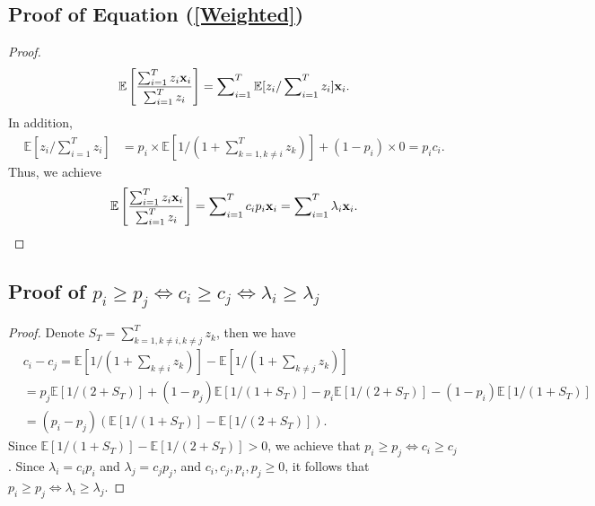 \documentclass{article} \usepackage{iclr2019_conference,times}
\begin{document}
\subsection{Proof of Equation (\ref{Weighted})}
\begin{proof}
\begin{align}
\mathbb{E}\left[ \frac{\sum\nolimits_{i = 1} ^T {{z_i}{{\bf{x}}_i}}}{\sum\nolimits_{i = 1}^T {{z_i}}} \right] =  \sum\nolimits_{i = 1}^T {\mathbb{E}[{z_i}/\sum\nolimits_{i=1}^T{{z_i}} ]} {{\bf{x}}_i}.
\end{align}
In addition, 
\begin{align}
{\mathbb{E}[{z_i}/\sum\nolimits_{i=1}^T{{z_i}} ]}& = p_i \times   \mathbb{E}\left[ {1/(1 + \sum\nolimits_{k = 1,k \ne i}^T {{z_k}} )} \right]  + (1-p_i) \times 0 
 = p_ic_i.
\end{align}
Thus, we achieve  
\begin{align}
\mathbb{E}\left[ \frac{\sum\nolimits_{i = 1} ^T {{z_i}{{\bf{x}}_i}}}{\sum\nolimits_{i = 1}^T {{z_i}}} \right] = \sum\nolimits_{i = 1} ^T {c_ip_i{\bf{x}}_i}  = \sum\nolimits_{i = 1} ^T {\lambda_i{\bf{x}}_i}.
\end{align}



\end{proof}

\subsection{Proof of ${p_i} \ge {p_j} \Leftrightarrow {c_i} \ge {c_j}  \Leftrightarrow {\lambda_i} \ge {\lambda_j} $}

\begin{proof}
Denote $S_T =  \sum\nolimits_{k = 1,k \ne i, k \ne j}^T {{z_k}}  $, then we have 
\begin{align}
& {c_i} - {c_j}   = \mathbb{E}\left[ {1/(1 + \sum\nolimits_{k \ne i} {{z_k}} )} \right] - \mathbb{E}\left[ {1/(1 + \sum\nolimits_{k \ne j} {{z_k}} )} \right]\\
& = {p_j}\mathbb{E}\left[ {1/(2 + {S_T})} \right]  + (1 - {p_j})\mathbb{E}\left[ {1/(1 + {S_T})} \right]   - {p_i}\mathbb{E}\left[ {1/(2 + {S_T})} \right] - (1 - {p_i})\mathbb{E}\left[ {1/(1 + {S_T})} \right] \nonumber\\
& = ({p_i} - {p_j})\left(  \mathbb{E}\left[ {1/(1 + {S_T})} \right] -   {\mathbb{E}\left[ {1/(2 + {S_T})} \right] }     \right).
\end{align}
Since $\mathbb{E}\left[ {1/(1 + {S_T})} \right] -   {\mathbb{E}\left[ {1/(2 + {S_T})} \right] } >0$,  we achieve that ${p_i} \ge {p_j} \Leftrightarrow {c_i} \ge {c_j} $.
Since $\lambda_i = c_ip_i$ and $\lambda_j = c_jp_j$, and $c_i,c_j,p_i,p_j \ge 0$, it follows that ${p_i} \ge {p_j} \Leftrightarrow {\lambda_i} \ge {\lambda_j} $.

\end{proof}
\end{document}
